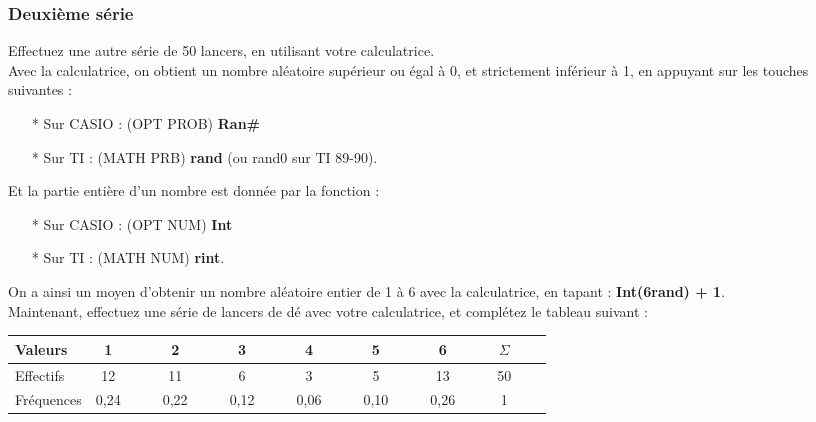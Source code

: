 \newpage

\subsubsection*{Deuxième série}

Effectuez une autre série de 50 lancers, en utilisant votre calculatrice. \\

Avec la calculatrice, on obtient un nombre aléatoire supérieur ou égal à 0, et strictement inférieur à 1, en appuyant sur les touches suivantes : 

\begin{itemize}
\item[*] Sur CASIO : (OPT PROB) \textbf{Ran\#}
\item[*] Sur TI : (MATH PRB) \textbf{rand} (ou rand0 sur TI 89-90).
\end{itemize}

\vspace*{.3cm}

Et la partie entière d'un nombre est donnée par la fonction :

\begin{itemize}
\item[*] Sur CASIO : (OPT NUM) \textbf{Int}
\item[*] Sur TI : (MATH NUM) \textbf{rint}.
\end{itemize}

\vspace*{.3cm}

On a ainsi un moyen d'obtenir un nombre aléatoire entier de 1 à 6 avec la calculatrice, en tapant : \textbf{Int(6rand) + 1}. \\

Maintenant, effectuez une série de lancers de dé avec votre calculatrice, et complétez le tableau suivant :

\begin{tabular}{|l|ccc|ccc|ccc|ccc|ccc|ccc|ccc|}
\hline
Valeurs & 1 & & & 2 & & & 3 & & & 4 & & & 5 & & & 6 & & & $\Sigma$ & &  \\
\hline
Effectifs & 12 & & & 11 & & & 6 & & & 3 & & & 5 & & & 13 & & & 50 & & \\
\hline
Fréquences & 0,24 & & & 0,22 & & & 0,12 & & & 0,06 & & & 0,10 & & & 0,26 & & & 1 & & \\
\hline
\end{tabular}

\vspace*{.3cm}

